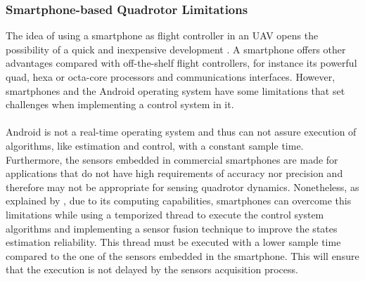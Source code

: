 \subsubsection{Smartphone-based Quadrotor Limitations}
The idea of using a smartphone as flight controller in an UAV opens the possibility of a quick and inexpensive development \cite{Aldrovandi2015}. A smartphone offers other advantages compared with off-the-shelf flight controllers, for instance its powerful quad, hexa or octa-core processors and communications interfaces. However, smartphones and the Android operating system have some limitations that set challenges when implementing a control system in it.\\\\
Android is not a real-time operating system and thus can not assure execution of algorithms, like estimation and control, with a constant sample time. Furthermore, the sensors embedded in commercial smartphones are made for applications that do not have high requirements of accuracy nor precision and therefore may not be appropriate for sensing quadrotor dynamics. Nonetheless, as explained by \cite{Bryant2015}, due to its computing capabilities, smartphones can overcome this limitations while using a temporized thread to execute the control system algorithms and implementing a sensor fusion technique to improve the states estimation reliability. This thread must be executed with a lower sample time compared to the one of the sensors embedded in the smartphone. This will ensure that the execution is not delayed by the sensors acquisition process.


